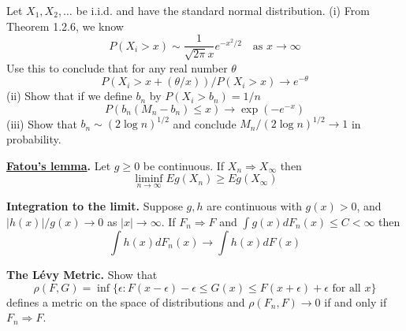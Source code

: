   \begin{exercise}[Durrett 3.2.3]
    Let $X_1, X_2, \dots$ be i.i.d. and have the standard normal distribution. (i) From Theorem 1.2.6, we know
    \begin{equation*}
      P(X_i > x) \sim \frac{1}{\sqrt{2\pi} x} e^{-x^2/2} \quad \text{as } x \to \infty
    \end{equation*}
    Use this to conclude that for any real number $\theta$
    \begin{equation*}
      P(X_i > x + (\theta/x))/P(X_i > x) \to e^{-\theta}
    \end{equation*}
    (ii) Show that if we define $b_n$ by $P(X_i > b_n) = 1/n$
    \begin{equation*}
      P(b_n(M_n - b_n) \leq x) \to \exp(-e^{-x})
    \end{equation*}
    (iii) Show that $b_n \sim (2 \log n)^{1/2}$ and conclude $M_n/(2 \log n)^{1/2} \to 1$ in probability.
  \end{exercise}
  \begin{solution}

  \end{solution}

  \begin{exercise}[Durrett 3.2.4]
    \textbf{\hyperref[mt-thm:fatous-lemma]{Fatou's lemma}.} Let $g \geq 0$ be continuous. If $X_n \Rightarrow X_\infty$ then
    \begin{equation*}
      \liminf_{n \to \infty} E g(X_n) \geq E g(X_\infty)
    \end{equation*}
  \end{exercise}
  \begin{solution}

  \end{solution}

  \begin{exercise}[Durrett 3.2.5]
    \textbf{Integration to the limit.} Suppose $g, h$ are continuous with $g(x) > 0$, and $|h(x)|/g(x) \to 0$ as $|x| \to \infty$. If $F_n \Rightarrow F$ and $\int g(x) dF_n(x) \leq C < \infty$ then
    \begin{equation*}
      \int h(x) dF_n(x) \to \int h(x) dF(x)
    \end{equation*}
  \end{exercise}
  \begin{solution}

  \end{solution}

  \begin{exercise}[Durrett 3.2.6]
    \textbf{The Lévy Metric.} Show that
    \begin{equation*}
      \rho(F, G) = \inf\{\epsilon : F(x - \epsilon) - \epsilon \leq G(x) \leq F(x + \epsilon) + \epsilon \text{ for all } x\}
    \end{equation*}
    defines a metric on the space of distributions and $\rho(F_n, F) \to 0$ if and only if $F_n \Rightarrow F$.
  \end{exercise}
  \begin{solution}

  \end{solution}

